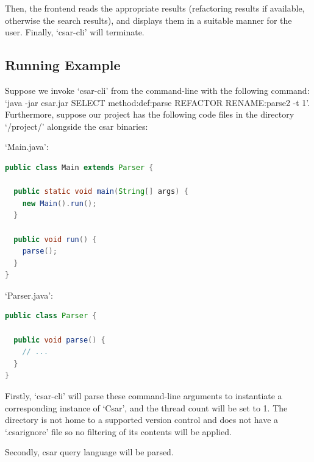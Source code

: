 \documentclass[12pt, letterpaper]{article}
\begin{document}
Then, the frontend reads the appropriate results (refactoring results if available, otherwise the search results), and displays them in a suitable manner for the user.
Finally, `csar-cli' will terminate.

\subsection{Running Example}
Suppose we invoke `csar-cli' from the command-line with the following command: `java -jar csar.jar SELECT method:def:parse REFACTOR RENAME:parse2 -t 1'.
Furthermore, suppose our project has the following code files in the directory `/project/' alongside the csar binaries:

`Main.java':
\begin{lstlisting}[language=Java]
public class Main extends Parser {

  public static void main(String[] args) {
    new Main().run();
  }

  public void run() {
    parse();
  }
}
\end{lstlisting}

`Parser.java':
\begin{lstlisting}[language=Java]
public class Parser {

  public void parse() {
    // ...
  }
}
\end{lstlisting}

Firstly, `csar-cli' will parse these command-line arguments to instantiate a corresponding instance of `Csar', and the thread count will be set to 1.
The directory is not home to a supported version control and does not have a `.csarignore' file so no filtering of its contents will be applied.

Secondly, csar query language will be parsed.
\end{document}
